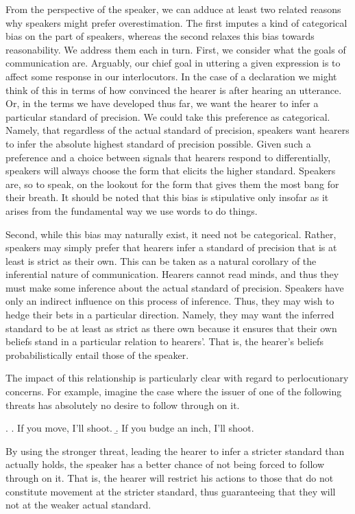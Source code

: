 From the perspective of the speaker, we can adduce at least two related reasons why speakers might prefer overestimation. The first imputes a kind of categorical bias on the part of speakers, whereas the second relaxes this bias towards reasonability. We address them each in turn. First, we consider what the goals of communication are. Arguably, our chief goal in uttering a given expression is to affect some response in our interlocutors. In the case of a declaration we might think of this in terms of how convinced the hearer is after hearing an utterance. Or, in the terms we have developed thus far, we want the hearer to infer a particular standard of precision. We could take this preference as categorical. Namely, that regardless of the actual standard of precision, speakers want hearers to infer the absolute highest standard of precision possible. Given such a preference and a choice between signals that hearers respond to differentially, speakers will always choose the form that elicits the higher 
standard.  Speakers are, so to speak, on the lookout for the form that gives them the most bang for their breath. It should be noted that this bias is stipulative only insofar as it arises from the fundamental way we use words to do things.

Second, while this bias may naturally exist, it need not be categorical. Rather, speakers may simply prefer that hearers infer a standard of precision that is at least is strict as their own. This can be taken as a natural corollary of the inferential nature of communication. Hearers cannot read minds, and thus they must make some inference about the actual standard of precision. Speakers have only an indirect influence on this process of inference. Thus, they may wish to hedge their bets in a particular direction. Namely, they may want the inferred standard to be at least as strict as there own because it ensures that their own beliefs stand in a particular relation to hearers'. That is, the hearer's beliefs probabilistically entail those of the speaker.

The impact of this relationship is particularly clear with regard to perlocutionary concerns. For example, imagine the case where the issuer of one of the following threats has absolutely no desire to follow through on it.

  \ex. \a. If you move, I'll shoot.
       \b. If you budge an inch, I'll shoot.

By using the stronger threat, leading the hearer to infer a stricter standard than actually holds, the speaker has a better chance of not being forced to follow through on it. That is, the hearer will restrict his actions to those that do not constitute movement at the stricter standard, thus guaranteeing that they will not at the weaker actual standard. 

